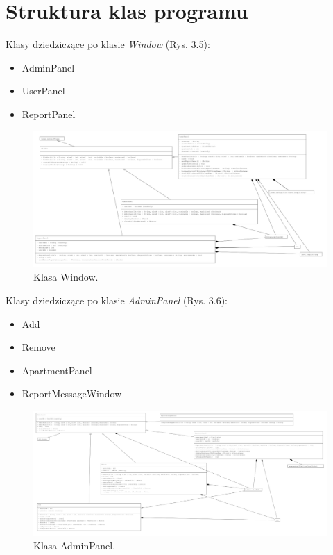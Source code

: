 \newpage \section{Struktura klas programu}
\noindent Klasy dziedziczące po klasie \textit{Window} (Rys. 3.5):
\begin{itemize}
    \item AdminPanel
    \item UserPanel
    \item ReportPanel
\end{itemize}

\begin{figure}[H]
    \centering
    \includegraphics[width=\textwidth,height=1\textheight,keepaspectratio]{figures/UML/main-panels.png}
    \caption{Klasa Window.\label{fig23}}
\end{figure}

\noindent Klasy dziedziczące po klasie \textit{AdminPanel} (Rys. 3.6):
\begin{itemize}
    \item Add
    \item Remove
    \item ApartmentPanel
    \item ReportMessageWindow
\end{itemize}

\begin{figure}[H]
    \centering
    \includegraphics[width=\textwidth,height=1\textheight,keepaspectratio]{figures/UML/admin-extends.png}
    \caption{Klasa AdminPanel.\label{fig24}}
\end{figure}

